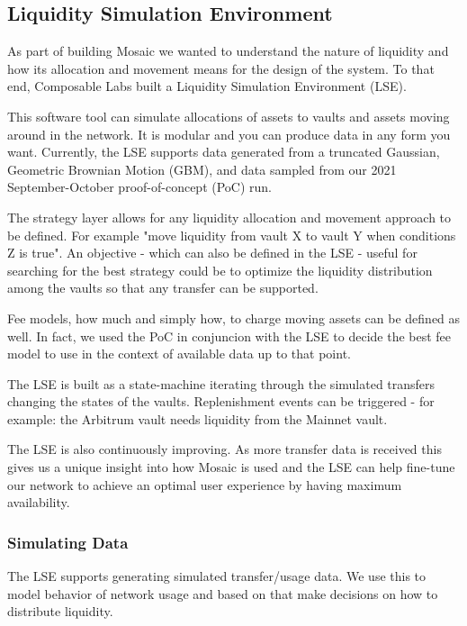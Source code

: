\subsection{Liquidity Simulation Environment\label{section:lse}}

As part of building Mosaic\cite{MosaicFinance} we wanted to understand the nature of liquidity and how its allocation and movement means for the design of the system.
%
To that end, Composable Labs\cite{IntroducingMedium} built a Liquidity Simulation Environment (LSE).\cite{IntroducingMediumb}

This software tool can simulate allocations of assets to vaults and assets moving around in the network.
%
It is modular and you can produce data in any form you want.
%
Currently, the LSE supports data generated from a truncated Gaussian, Geometric Brownian Motion (GBM), and data sampled from our 2021 September-October proof-of-concept (PoC) run.\cite{TestingMedium}

The strategy layer allows for any liquidity allocation and movement approach to be defined. For example "move liquidity from vault X to vault Y when conditions Z is true".
%
An objective - which can also be defined in the LSE - useful for searching for the best strategy could be to optimize the liquidity distribution among the vaults so that any transfer can be supported.

Fee models, how much and simply how, to charge moving assets can be defined as well. In fact, we used the PoC in conjuncion with the LSE to decide the best fee model to use in the context of available data up to that point.

The LSE is built as a state-machine iterating through the simulated transfers changing the states of the vaults. Replenishment events can be triggered - for example: the Arbitrum vault needs liquidity from the Mainnet vault.

The LSE is also continuously improving. As more transfer data is received this gives us a unique insight into how Mosaic is used and the LSE can help fine-tune our network to achieve an optimal user experience by having maximum availability.

\subsubsection{Simulating Data}

The LSE supports generating simulated transfer/usage data. We use this to model behavior of network usage and based on that make decisions on how to distribute liquidity.

